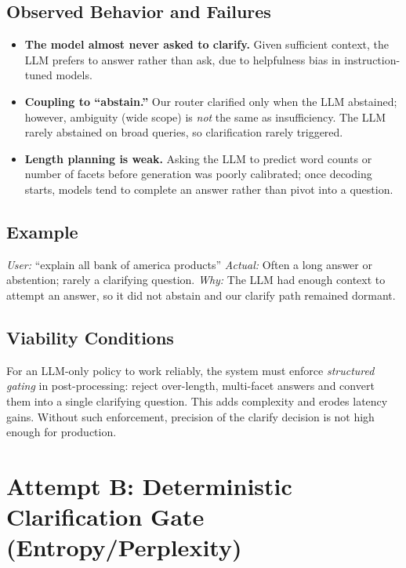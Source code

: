 \documentclass[11pt]{article}
\begin{document}
\subsection{Observed Behavior and Failures}
\begin{itemize}[leftmargin=1.25em]
  \item \textbf{The model almost never asked to clarify.} Given sufficient context, the LLM prefers to answer rather than ask, due to helpfulness bias in instruction-tuned models.
  \item \textbf{Coupling to ``abstain.''} Our router clarified only when the LLM abstained; however, ambiguity (wide scope) is \emph{not} the same as insufficiency. The LLM rarely abstained on broad queries, so clarification rarely triggered.
  \item \textbf{Length planning is weak.} Asking the LLM to predict word counts or number of facets before generation was poorly calibrated; once decoding starts, models tend to complete an answer rather than pivot into a question.
\end{itemize}

\subsection{Example}
\emph{User:} ``explain all bank of america products'' \quad
\emph{Actual:} Often a long answer or abstention; rarely a clarifying question. \quad
\emph{Why:} The LLM had enough context to attempt an answer, so it did not abstain and our clarify path remained dormant.

\subsection{Viability Conditions}
For an LLM-only policy to work reliably, the system must enforce \emph{structured gating} in post-processing: reject over-length, multi-facet answers and convert them into a single clarifying question. This adds complexity and erodes latency gains. Without such enforcement, precision of the clarify decision is not high enough for production.

\section{Attempt B: Deterministic Clarification Gate (Entropy/Perplexity)}
\end{document}
